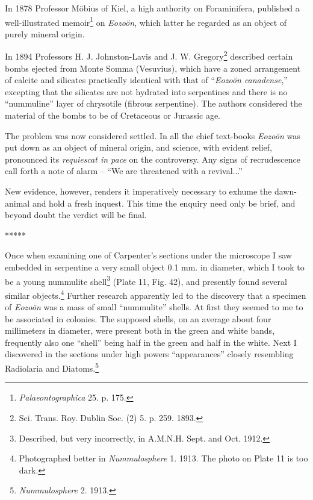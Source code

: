 \documentclass[a4paper, 12pt, oneside]{article}
\begin{document}
In 1878 Professor Möbius of Kiel, a high authority on Foraminifera, published a well-illustrated memoir\footnote{\emph{Palaeontographica} 25. p. 175.} on \emph{Eozoön}, which latter he regarded as an object of purely mineral origin.

In 1894 Professors H. J. Johnston-Lavis and J. W. Gregory\footnote{Sci. Trans. Roy. Dublin Soc. (2) 5. p. 259. 1893.} described certain bombs ejected from Monte Somma (Vesuvius), which have a zoned arrangement of calcite and silicates practically identical with that of ``\emph{Eozoön canadense},'' excepting that the silicates are not hydrated into serpentines and there is no ``nummuline'' layer of chrysotile (fibrous serpentine). The authors considered the material of the bombs to be of Cretaceous or Jurassic age.

The problem was now considered settled. In all the chief text-books \emph{Eozoön} was put down as an object of mineral origin, and science, with evident relief, pronounced its \emph{requiescat in pace} on the controversy. Any signs of recrudescence call forth a note of alarm -- ``We are threatened with a revival...''

New evidence, however, renders it imperatively necessary to exhume the dawn-animal and hold a fresh inquest. This time the enquiry need only be brief, and beyond doubt the verdict will be final.

\centerline{*\hspace{15mm}*\hspace{15mm}*\hspace{15mm}*\hspace{15mm}*}
\bigskip

Once when examining one of Carpenter's sections under the microscope I saw embedded in serpentine a very small object 0.1 mm. in diameter, which I took to be a young nummulite shell\footnote{Described, but very incorrectly, in A.M.N.H. Sept. and Oct. 1912.} (Plate 11, Fig. 42), and presently found several similar objects.\footnote{Photographed better in \emph{Nummulosphere} 1. 1913. The photo on Plate 11 is too dark.} Further research apparently led to the discovery that a specimen of \emph{Eozoön} was a mass of small ``nummulite'' shells. At first they seemed to me to be associated in colonies. The supposed shells, on an average about four millimeters in diameter, were present both in the green and white bands, frequently also one ``shell'' being half in the green and half in the white. Next I discovered in the sections under high powers ``appearances'' closely resembling Radiolaria and Diatoms.\footnote{\emph{Nummulosphere} 2. 1913.}
\end{document}
